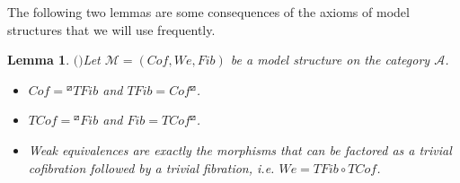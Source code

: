 \documentclass[12pt]{amsart}
\numberwithin{equation}{section}
\newtheorem{lemma}{Lemma}[section]
\theoremstyle{definition}
\newtheorem*{theorem 0*}{Theorem}
\newtheorem*{theorem a*}{Theorem A}
\newtheorem*{theorem b*}{Theorem B}
\numberwithin{diagram}{section}
\begin{document}
The following two lemmas are some consequences of the axioms of model structures that we will use frequently.
	
\begin{lemma}$($\cite{H1}$)$\label{2.6}
Let $\mathcal{M}=(Cof,We,Fib)$ be a model structure on the category $\mathcal{A}$.
	\begin{itemize}
	\item[(1)]
	$Cof={}^{\boxslash}TFib$ and $TFib=Cof{}^{\boxslash}$.
	\item[(2)]
	$TCof={}^{\boxslash}Fib$ and $Fib=TCof{}^{\boxslash}$.
	\item[(3)]
	Weak equivalences are exactly the morphisms that can be factored as a trivial cofibration followed by a trivial fibration, i.e. $We=TFib \circ TCof$.
	\end{itemize}
\end{lemma}
\end{document}
